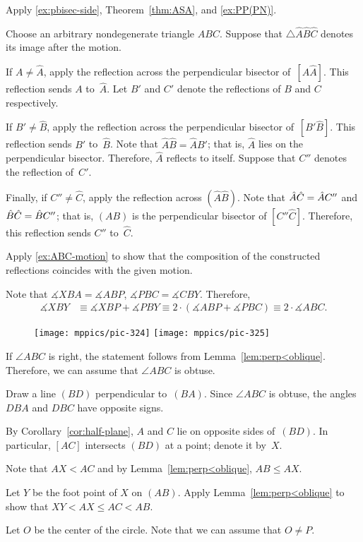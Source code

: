 Apply \ref{ex:pbisec-side}, Theorem~\ref{thm:ASA}, and \ref{ex:PP(PN)}.

Choose an arbitrary nondegenerate triangle $ABC$.
Suppose that $\triangle \hat A \hat B\hat C$ denotes its image after the motion.

If $A\ne \hat A$, apply the reflection across the perpendicular bisector of~$[A\hat A]$.
This reflection sends $A$ to~$\hat A$.
Let $B'$ and $C'$ denote the reflections of $B$ and $C$ respectively.

If $B'\ne \hat B$, apply the reflection across the perpendicular bisector of~$[B'\hat B]$.
This reflection sends $B'$ to~$\hat B$.
Note that $\hat A\hat B=\hat AB'$;
that is, $\hat A$ lies on the perpendicular bisector. 
Therefore, $\hat A$ reflects to itself.
Suppose that $C''$ denotes the reflection of~$C'$.

Finally, if $C''\ne \hat C$, apply the reflection across $(\hat A\hat B)$.
Note that $\hat A\hat C\z=\hat AC''$ and $\hat B\hat C\z=\hat BC''$;
that is, $(AB)$ is the perpendicular bisector of $[C''\hat C]$.
Therefore, this reflection sends $C''$ to~$\hat C$.

Apply \ref{ex:ABC-motion} to show that the composition of the constructed reflections coincides with the given motion.

Note that $\measuredangle XBA=\measuredangle ABP$, $\measuredangle PBC=\measuredangle CBY$.
Therefore,
\begin{align*}
\measuredangle XBY
&\equiv
\measuredangle XBP+\measuredangle PBY
\equiv
 2\cdot(\measuredangle ABP+\measuredangle PBC)
\equiv
 2\cdot \measuredangle ABC.
\end{align*}

{

\begin{wrapfigure}{r}{27mm}
\vskip-7mm
\centering
\texttt{[image: mppics/pic-324]}
\bigskip
\texttt{[image: mppics/pic-325]}
\end{wrapfigure}

If $\angle ABC$ is right, the statement follows from Lemma~\ref{lem:perp<oblique}.
Therefore, we can assume that $\angle ABC$ is obtuse.

Draw a line $(BD)$ perpendicular to~$(BA)$.
Since $\angle ABC$ is obtuse, 
the angles $DBA$ and $DBC$ have opposite signs.

By Corollary~\ref{cor:half-plane},
$A$ and $C$ lie on opposite sides of~$(BD)$.
In particular, $[AC]$ intersects $(BD)$ at a point; denote it by~$X$.

Note that $AX<AC$ and by Lemma~\ref{lem:perp<oblique}, $AB\le AX$.


Let $Y$ be the foot point of $X$ on $(AB)$.
Apply Lemma~\ref{lem:perp<oblique} to show that 
$XY<AX\le AC<AB$.

Let $O$ be the center of the circle.
Note that we can assume that $O\ne P$.

}

